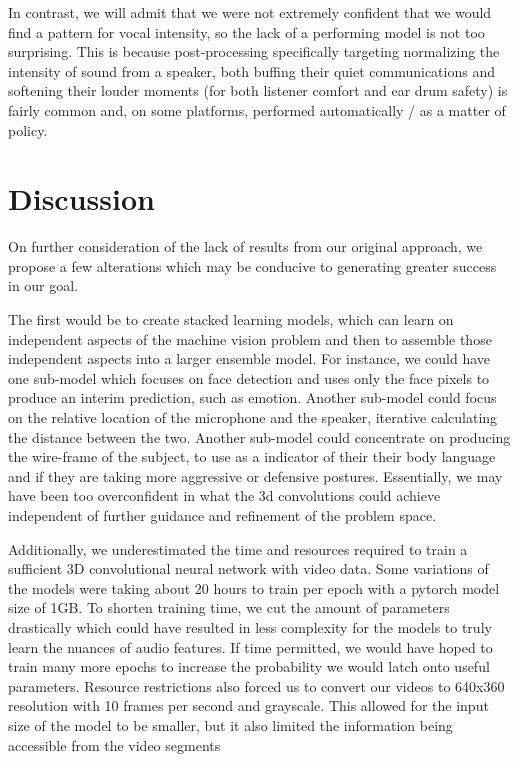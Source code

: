 \documentclass[10pt,twocolumn,letterpaper]{article}
\begin{document}
In contrast, we will admit that we were not extremely confident that we would find a pattern for vocal intensity, so the lack of a performing model is not too surprising. This is because post-processing specifically targeting normalizing the intensity of sound from a speaker, both buffing their quiet communications and softening their louder moments (for both listener comfort and ear drum safety) is fairly common and, on some platforms, performed automatically / as a matter of policy. 



\section{Discussion}
\label{sec:discussion}

On further consideration of the lack of results from our original approach, we propose a few alterations which may be conducive to generating greater success in our goal.

The first would be to create stacked learning models, which can learn on independent aspects of the machine vision problem and then to assemble those independent aspects into a larger ensemble model. For instance, we could have one sub-model which focuses on face detection and uses only the face pixels to produce an interim prediction, such as emotion. Another sub-model could focus on the relative location of the microphone and the speaker, iterative calculating the distance between the two. Another sub-model could concentrate on producing the wire-frame of the subject, to use as a indicator of their their body language and if they are taking more aggressive or defensive postures. Essentially, we may have been too overconfident in what the 3d convolutions could achieve independent of further guidance and refinement of the problem space.

Additionally, we underestimated the time and resources required to train a sufficient 3D convolutional neural network with video data. Some variations of the models were taking about 20 hours to train per epoch with a pytorch model size of 1GB. To shorten training time, we cut the amount of parameters drastically which could have resulted in less complexity for the models to truly learn the nuances of audio features. If time permitted, we would have hoped to train many more epochs to increase the probability we would latch onto useful parameters. Resource restrictions also forced us to convert our videos to 640x360 resolution with 10 frames per second and grayscale. This allowed for the input size of the model to be smaller, but it also limited the information being accessible from the video segments
\end{document}
